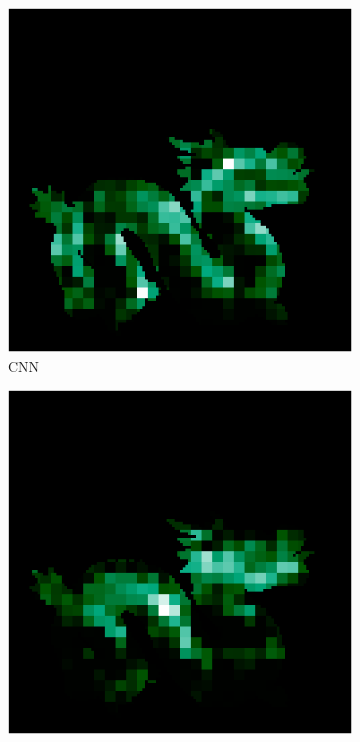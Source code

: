 \begin{figure}[H]
\begin{minipage}{0.32\linewidth}
				\begin{subfigure}[t]{0.45\linewidth}
					\includegraphics[width=\linewidth]{./Figures/feature_map_gcnn/feature_map_gcnn-cnn_65.png}
					\caption{CNN}
				\end{subfigure}
				\begin{subfigure}[t]{0.45\linewidth}
				\includegraphics[width=\linewidth]{./Figures/feature_map_gcnn/feature_map_gcnn-cnn_28.png}

\end{subfigure}
\end{minipage}
\end{figure}
